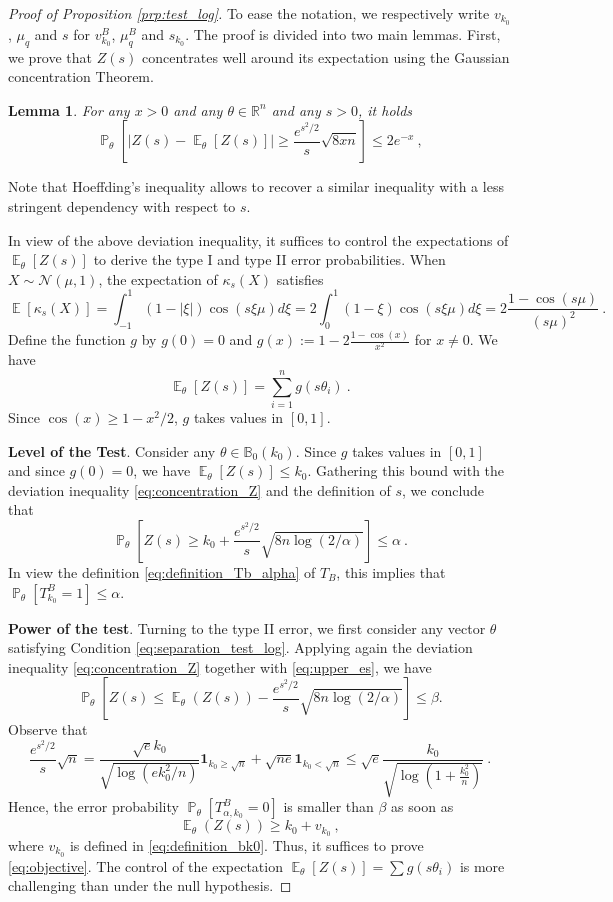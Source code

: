 \documentclass[twoside,11pt]{article}
\newtheorem{lem}{Lemma}
\def\beq{\begin{equation}}
\def\eeq{\end{equation}}
\def\cN{\mathcal{N}}
\newcommand{\E}{\operatorname{\mathbb{E}}}
\renewcommand{\P}{\operatorname{\mathbb{P}}}
\newcommand{\<}{\langle}
\renewcommand{\>}{\rangle}
\begin{document}
 
 \begin{proof}[Proof of Proposition \ref{prp:test_log}]
 To ease the notation, we respectively write $v_{k_0}$, $\mu_q$ and $s$ for $v_{k_0}^B$, $\mu_q^B$ and $s_{k_0}$. The proof is divided into two main lemmas. First, we prove that $Z(s)$ concentrates well around its expectation using the Gaussian concentration Theorem. 
 \begin{lem}\label{lem:concentration_Z}
For any $x>0$ and any $\theta\in \mathbb{R}^n$ and any $s>0$,  it holds 
 \beq\label{eq:concentration_Z}
 \P_{\theta}\left[\big| Z(s) - \E_{\theta}[Z(s) ]\big|\geq  \frac{e^{s^2/2}}{s} \sqrt{8xn}\right]\leq 2e^{-x} \ , 
\eeq  
 \end{lem}
 Note that Hoeffding's inequality allows to recover a similar inequality with a less stringent dependency with respect to $s$.
 
 
In view of the above deviation inequality, it suffices to control the expectations of $\E_{\theta}[Z(s)]$  to derive the type I and type II error  probabilities.  When $X\sim \cN(\mu,1)$, the expectation of $\kappa_{s}(X)$ satisfies 
\[
 \E[\kappa_{s}(X)]= \int_{-1}^1 (1-|\xi|) \cos(s\xi \mu)d\xi = 2\int_{0}^{1}(1-\xi)\cos(s \xi \mu)d\xi= 2\frac{1-\cos(s\mu)}{(s\mu)^2}  \ .
\]
Define the function $g$ by $g(0)=0$ and  $g(x):= 1- 2\frac{1-\cos(x)}{x^2}$ for $x\neq 0$. We have  
\beq \label{eq:decomposition_expectation_Z}
 \E_{\theta}[Z(s)]= \sum_{i=1}^n g(s\theta_i)\ .
\eeq
Since $\cos(x)\geq 1-x^2/2$, $g$ takes values in $[0,1]$.



\bigskip
\noindent 
  {\bf Level of the Test}.  Consider any $\theta\in \mathbb{B}_0(k_0)$. Since $g$ takes values in $[0,1]$ and since $g(0)=0$, we have  $\E_{\theta}[Z(s)] \leq k_0$. Gathering this bound with the deviation inequality \eqref{eq:concentration_Z} and the definition of $s$, we conclude that 
\[
\P_{\theta}\left[Z(s)\geq k_0 + \frac{e^{s^2/2}}{s} \sqrt{8n\log(2/\alpha)}\right]\leq \alpha\ . 
\]
In view the definition \eqref{eq:definition_Tb_alpha} of $T_B$, this implies  that $\P_{\theta}[T^B_{k_0}=1]\leq \alpha$.

 
\bigskip

\noindent 
  {\bf Power of the test}. Turning to  the type II error, we first consider any vector $\theta$ satisfying Condition \eqref{eq:separation_test_log}.
Applying again the deviation inequality \eqref{eq:concentration_Z} together with \eqref{eq:upper_es}, we have 
\[\P_{\theta}\left[Z(s)\leq \E_{\theta}(Z(s)) -  \frac{e^{s^2/2}}{s} \sqrt{8n\log(2/\alpha)}\right]\leq \beta.\]
Observe that
\beq\label{eq:upper_es} 
\frac{e^{s^2/2}}{s}\sqrt{n}= \frac{\sqrt{e}k_0}{\sqrt{\log(ek_0^2/n)}}\mathbf{1}_{k_0\geq \sqrt{n}} + \sqrt{ne}\mathbf{1}_{k_0 < \sqrt{n}}\leq  \sqrt{e} \frac{k_0}{\sqrt{\log(1+\frac{k_0^2}{n})}}\ .
\eeq 
Hence,  the error probability $\P_{\theta}[T^{B}_{\alpha,k_0}=0]$ is smaller than $\beta$ as soon as 
\beq\label{eq:objective}
 \E_{\theta}(Z(s)) \geq k_0+ v_{k_0}\ ,
\eeq
where $v_{k_0}$ is defined in \eqref{eq:definition_bk0}. Thus, it suffices to prove \eqref{eq:objective}. The control of the expectation $\E_{\theta}[Z(s)]= \sum g(s\theta_i)$ is more challenging than under the null hypothesis. 



\end{proof}
\end{document}

